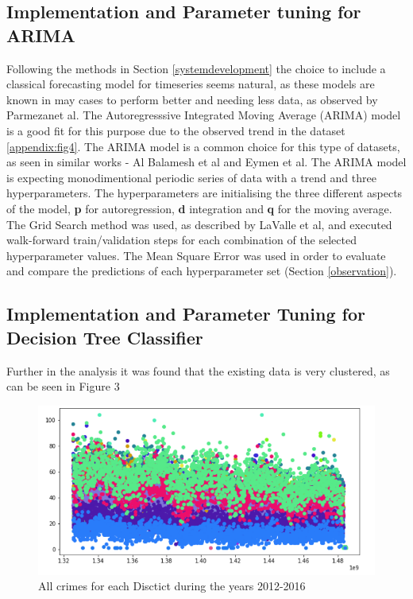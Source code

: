 \documentclass[a4paper, twocolumn]{article}
\begin{document}
\subsection{Implementation and Parameter tuning for ARIMA}\label{ARIMA}
Following the methods in Section \ref{systemdevelopment} the choice to include a classical forecasting model for timeseries seems natural, as these models are known in may cases to perform better and needing less data, as observed by Parmezanet al. \cite{test} 
The Autoregresssive Integrated Moving Average (ARIMA) model is a good fit for this purpose due to the observed trend in the dataset \ref{appendix:fig4}. 
The ARIMA model is a common choice for this type of datasets, as seen in similar works - Al Balamesh et al and Eymen et al. \cite{one} \cite{two} 
The ARIMA model is expecting monodimentional periodic series of data with a trend and three hyperparameters. 
The hyperparameters are initialising the three different aspects of the model, \textbf{p} for autoregression, \textbf{d} integration and \textbf{q} for the moving average. 
The Grid Search method was used, as described by LaValle et al, \cite{lavalle2004relationship} and executed walk-forward train/validation steps for each combination of the selected hyperparameter values. 
The Mean Square Error was used in order to evaluate and compare the predictions of each hyperparameter set (Section \ref{observation}).

\subsection{Implementation and Parameter Tuning for Decision Tree Classifier}
Further in the analysis it was found that the existing data is very clustered, as can be seen in Figure 3

\begin{figure}[h]
    \label{figure:}
    \includegraphics[scale=0.3]{fig5.png}
    \caption{All crimes for each Disctict during the years 2012-2016}
\end{figure}
\end{document}
